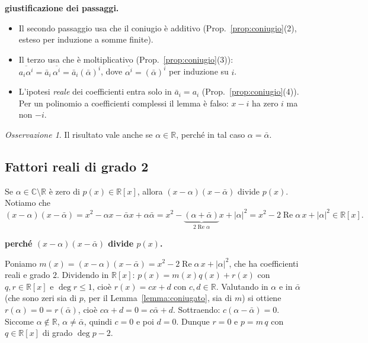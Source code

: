 \documentclass[11pt,a4paper]{article}
\newcommand{\RR}{\mathbb{R}}
\newcommand{\CC}{\mathbb{C}}
\renewcommand{\Re}{\operatorname{Re}}
\theoremstyle{plain}
\theoremstyle{definition}
\theoremstyle{remark}
\newtheorem{oss}[prop]{Osservazione}
\begin{document}
\par\medskip
\noindent\textbf{giustificazione dei passaggi.}\par

\begin{itemize}[leftmargin=*]
  \item Il secondo passaggio usa che il coniugio è additivo (Prop.~\ref{prop:coniugio}(2), esteso per induzione a somme finite).
  \item Il terzo usa che è moltiplicativo (Prop.~\ref{prop:coniugio}(3)): $\overline{a_i\alpha^i}=\bar a_i\,\overline{\alpha^i}=\bar a_i(\bar\alpha)^i$, dove
  $\overline{\alpha^i}=(\bar\alpha)^i$ per induzione su $i$.
  \item L'ipotesi \emph{reale} dei coefficienti entra solo in $\bar a_i=a_i$ (Prop.~\ref{prop:coniugio}(4)).
  Per un polinomio a coefficienti complessi il lemma è falso: $x-i$ ha zero $i$ ma non $-i$.
\end{itemize}
\par\medskip

\begin{oss}
Il risultato vale anche se $\alpha\in\RR$, perché in tal caso $\alpha=\bar\alpha$.
\end{oss}

\subsection{Fattori reali di grado 2}

Se $\alpha\in\CC\setminus\RR$ è zero di $p(x)\in\RR[x]$, allora $(x-\alpha)(x-\bar\alpha)$ divide $p(x)$.
Notiamo che
\[
  (x-\alpha)(x-\bar\alpha)=x^2-\alpha x-\bar\alpha x+\alpha\bar\alpha=x^2-\underbrace{(\alpha+\bar\alpha)}_{2\Re\alpha}x+|\alpha|^2
  =x^2-2\Re\alpha\,x+|\alpha|^2\in\RR[x].
\]

\par\medskip
\noindent\textbf{perché $(x-\alpha)(x-\bar\alpha)$ divide $p(x)$.}\par

Poniamo $m(x)=(x-\alpha)(x-\bar\alpha)=x^2-2\Re\alpha\,x+|\alpha|^2$, che ha coefficienti reali e grado $2$.
Dividendo in $\RR[x]$: $p(x)=m(x)q(x)+r(x)$ con $q,r\in\RR[x]$ e $\deg r\le1$, cioè $r(x)=cx+d$ con $c,d\in\RR$.
Valutando in $\alpha$ e in $\bar\alpha$ (che sono zeri sia di $p$, per il Lemma~\ref{lemma:coniugato}, sia di $m$) si ottiene
$r(\alpha)=0=r(\bar\alpha)$, cioè $c\alpha+d=0=c\bar\alpha+d$. Sottraendo: $c(\alpha-\bar\alpha)=0$.
Siccome $\alpha\notin\RR$, $\alpha\ne\bar\alpha$, quindi $c=0$ e poi $d=0$. Dunque $r=0$ e $p=m\,q$ con $q\in\RR[x]$ di grado $\deg p-2$.
\par\medskip
\end{document}
